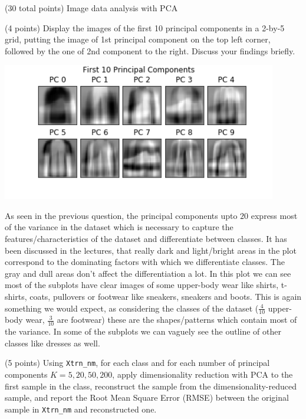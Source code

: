 \documentclass[12pt]{article}
\begin{document}
\begin{question}{(30 total points) Image data analysis with PCA}
\begin{subquestion}
   \end{subquestion}

   \begin{subquestion}{(4 points)
      Display the images of the first 10 principal components in
      a 2-by-5 grid, putting the image of 1st principal component on
      the top left corner, followed by the one of 2nd component to the right.
      Discuss your findings briefly.
     } \label{Q1.disp.pca}
   

      \begin{answerbox}{35em}
         \begin{center}
            \includegraphics[width=0.9\textwidth]{results/1_5.png}
        \end{center}
        As seen in the previous question, the principal components upto $20$ express most of the variance in the dataset which is necessary to capture the features/characteristics of the dataset and differentiate between classes. It has been discussed in the lectures, that really dark and light/bright areas in the plot correspond to the dominating factors with which we differentiate classes. The gray and dull areas don't affect the differentiation a lot. In this plot we can see most of the subplots have clear images of some upper-body wear like shirts, t-shirts, coats, pullovers or footwear like sneakers, sneakers and boots. This is again something we would expect, as considering the classes of the dataset ($\frac{4}{10}$ upper-body wear, $\frac{3}{10}$ are footwear) these are the shapes/patterns which contain most of the variance. In some of the subplots we can vaguely see the outline of other classes like dresses as well.
    \end{answerbox}
  


   \end{subquestion}

   \begin{subquestion}{(5 points)
       Using \texttt{Xtrn\_nm}, 
       for each class and for each number of principal components $K =
       5, 20, 50, 200$, apply dimensionality reduction with PCA to the
       first sample in the class, reconstruct the sample from the
       dimensionality-reduced sample, and 
       report the Root Mean Square Error (RMSE) between the
       original sample in {\tt Xtrn\_nm} and reconstructed one.
     } \label{Q1.6}


\end{subquestion}
\end{question}
\end{document}
